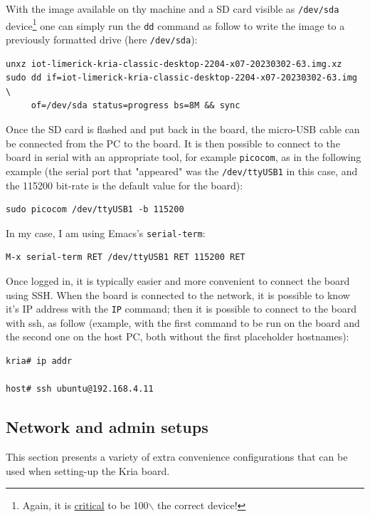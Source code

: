 \documentclass[10pt]{article}
\begin{document}
With the image available on thy machine and a SD card visible as \texttt{/dev/sda} device\footnote{Again, it is \uline{critical} to be 100$\backslash$%
the correct device!}
one can simply run the \texttt{dd} command as follow to write the image to a previously formatted drive (here \texttt{/dev/sda}):

\begin{verbatim}
unxz iot-limerick-kria-classic-desktop-2204-x07-20230302-63.img.xz
sudo dd if=iot-limerick-kria-classic-desktop-2204-x07-20230302-63.img \
     of=/dev/sda status=progress bs=8M && sync
\end{verbatim}


Once the SD card is flashed and put back in the board, the micro-USB cable can be
connected from the PC to the board. It is then possible to
connect to the board in serial with an appropriate tool, for example \texttt{picocom},
as in the following example (the serial port that "appeared" was the \texttt{/dev/ttyUSB1} in this case,
and the 115200 bit-rate is the default value for the board):

\begin{verbatim}
sudo picocom /dev/ttyUSB1 -b 115200
\end{verbatim}

In my case, I am using Emacs's \texttt{serial-term}:
\begin{verbatim}
M-x serial-term RET /dev/ttyUSB1 RET 115200 RET
\end{verbatim}


Once logged in, it is typically easier and more convenient to connect the board
using SSH. When the board is connected to the network, it is possible to know
it's IP address with the \texttt{IP} command; then it is possible to connect to
the board with ssh, as follow (example, with the first command to be run on the board
and the second one on the host PC, both without the first placeholder hostnames):
\begin{verbatim}
kria# ip addr

host# ssh ubuntu@192.168.4.11
\end{verbatim}

\subsection{Network and admin setups}
\label{sec:org664b1bb}
This section presents a variety of extra convenience configurations
that can be used when setting-up the Kria board.
\end{document}
